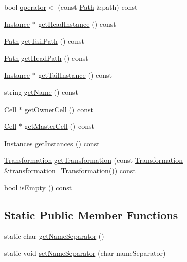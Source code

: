 \begin{DoxyCompactItemize}
\item 
bool \hyperlink{classHurricane_1_1Path_a5bf33d2d9e3e7d46db770e26c09be90b}{operator$<$} (const \hyperlink{classHurricane_1_1Path}{Path} \&path) const
\item 
\hyperlink{classHurricane_1_1Instance}{Instance} $\ast$ \hyperlink{classHurricane_1_1Path_afddde635f302cee0a215ca364e9689b5}{get\+Head\+Instance} () const
\item 
\hyperlink{classHurricane_1_1Path}{Path} \hyperlink{classHurricane_1_1Path_af0b27566643cc252d9a0feb1709d3180}{get\+Tail\+Path} () const
\item 
\hyperlink{classHurricane_1_1Path}{Path} \hyperlink{classHurricane_1_1Path_ae89034b297b27545cf3865e0cfa31f3d}{get\+Head\+Path} () const
\item 
\hyperlink{classHurricane_1_1Instance}{Instance} $\ast$ \hyperlink{classHurricane_1_1Path_a1f9350514c4751b54b2f01082a93e3bf}{get\+Tail\+Instance} () const
\item 
string \hyperlink{classHurricane_1_1Path_a97ff25c53f4e7bdacb7cb8a58adf6499}{get\+Name} () const
\item 
\hyperlink{classHurricane_1_1Cell}{Cell} $\ast$ \hyperlink{classHurricane_1_1Path_a0954eb842af9d863ea701aa0b681412e}{get\+Owner\+Cell} () const
\item 
\hyperlink{classHurricane_1_1Cell}{Cell} $\ast$ \hyperlink{classHurricane_1_1Path_a3f4a865f570375ec5b6e5cb487369696}{get\+Master\+Cell} () const
\item 
\hyperlink{namespaceHurricane_ac9436b03a2926f34ad6863deae2baadc}{Instances} \hyperlink{classHurricane_1_1Path_af820422a686ab35d611a6c1969e37e90}{get\+Instances} () const
\item 
\hyperlink{classHurricane_1_1Transformation}{Transformation} \hyperlink{classHurricane_1_1Path_af48dc47810f65e7aba6ee8f24ed8a09e}{get\+Transformation} (const \hyperlink{classHurricane_1_1Transformation}{Transformation} \&transformation=\hyperlink{classHurricane_1_1Transformation}{Transformation}()) const
\item 
bool \hyperlink{classHurricane_1_1Path_aeddd764b4b10c72630ee81119614935a}{is\+Empty} () const
\end{DoxyCompactItemize}
\subsection*{Static Public Member Functions}
\begin{DoxyCompactItemize}
\item 
static char \hyperlink{classHurricane_1_1Path_ac63015239df43b8c44a6d74a262eb3a2}{get\+Name\+Separator} ()
\item 
static void \hyperlink{classHurricane_1_1Path_a505231a4bf7e8041c7a01e482505cd7a}{set\+Name\+Separator} (char name\+Separator)
\end{DoxyCompactItemize}


